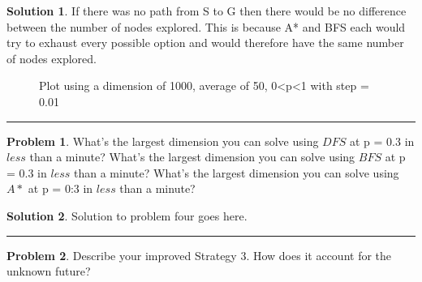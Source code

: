 \documentclass{article}
\theoremstyle{definition}
\newtheorem{problem}{Problem}
\def\fline{\rule{0.75\linewidth}{0.5pt}}
\newcommand{\finishline}{\vspace{-15pt}\begin{center}\fline\end{center}}
\newtheorem*{solution*}{Solution}
\newenvironment{solution}{\begin{solution*}}{{\finishline} \end{solution*}}
\begin{document}
\smallskip

\begin{solution}
    If there was no path from S to G then there would be no difference between the number of nodes explored. This is because A* and BFS each would try to exhaust every possible option and would therefore have the same number of nodes explored.
    
	\begin{figure}[h]
	\centering
	\caption{Plot using a dimension of 1000, average of 50, 0<p<1 with step = 0.01}
	\end{figure}
	
\end{solution}

\smallskip

\begin{problem}
	What's the largest dimension you can solve using $DFS$ at p = 0.3 in $less$ than a minute? What's the largest dimension you can solve using $BFS$ at p = 0.3 in $less$ than a minute? What's the largest dimension you can solve using $A*$ at p = 0:3 in $less$ than a minute?  
\end{problem}

\smallskip

\begin{solution}
	Solution to problem four goes here. 
\end{solution}

\smallskip

\begin{problem}
	Describe your improved Strategy 3. How does it account for the unknown future?
\end{problem}

\smallskip
\end{document}
